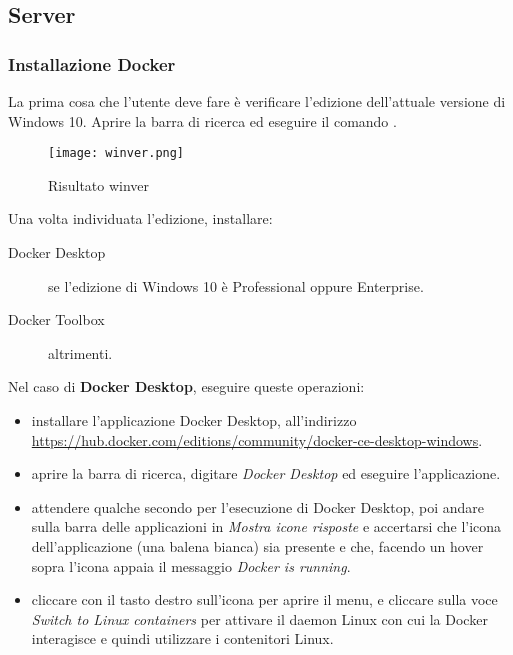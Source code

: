 \documentclass[../../manuale-manutentore.tex]{subfiles}
\begin{document}
\subsection{Server}%
\label{sub:installazione/server}

\subsubsection{Installazione Docker}%
\label{subs:installazione_docker}

La prima cosa che l'utente deve fare è verificare l'edizione dell'attuale versione di Windows 10. Aprire la barra di ricerca ed eseguire il comando .

\begin{figure}[H]
  \centering
  \texttt{[image: winver.png]}
  \caption{Risultato winver}%
  \label{fig:risultato_winver}
\end{figure}

Una volta individuata l'edizione, installare:
\begin{description}
  \item[Docker Desktop] se l'edizione di Windows 10 è Professional oppure Enterprise.
  \item[Docker Toolbox] altrimenti.
\end{description}

Nel caso di \textbf{Docker Desktop}, eseguire queste operazioni:
\begin{itemize}
  \item installare l'applicazione Docker Desktop, all'indirizzo \href{https://hub.docker.com/editions/community/docker-ce-desktop-windows}{https://hub.docker.com/editions/community/docker-ce-desktop-windows}.
  \item aprire la barra di ricerca, digitare \textit{Docker Desktop} ed eseguire l'applicazione.
  \item attendere qualche secondo per l'esecuzione di Docker Desktop, poi andare sulla barra delle applicazioni in \textit{Mostra icone risposte} e accertarsi che l'icona dell'applicazione (una balena bianca) sia presente e che, facendo un hover sopra l'icona appaia il messaggio \textit{Docker is running}.
  \item cliccare con il tasto destro sull'icona per aprire il menu, e cliccare sulla voce \textit{Switch to Linux containers} per attivare il daemon Linux con cui la Docker  interagisce e quindi utilizzare i contenitori Linux.
\end{itemize}
\end{document}
